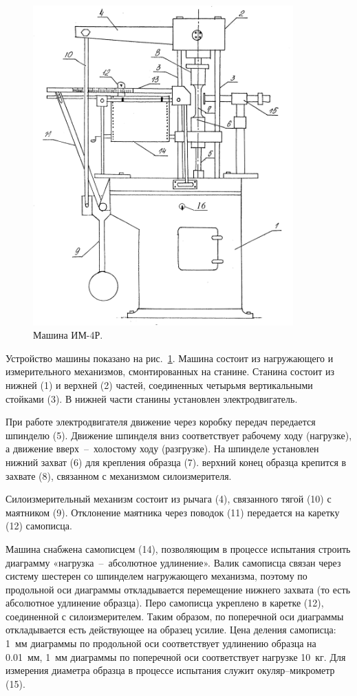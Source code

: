 \documentclass[12pt, a4paper]{article}
\begin{document}
    \begin{figure}[h]
        \centering
        \includegraphics[width = 10cm]{image_1.png}
        \caption{Машина ИМ-4Р.}
        \label{im1}
    \end{figure}
    
    Устройство машины показано на рис.~\ref{im1}. Машина состоит из нагружающего и измерительного механизмов, смонтированных на станине. Станина состоит из нижней (1) и верхней (2) частей, соединенных четырьмя вертикальными стойками (3). В нижней части станины установлен электродвигатель.
    
    При работе электродвигателя движение через коробку передач передается шпинделю (5). Движение шпинделя вниз соответствует рабочему ходу (нагрузке), а движение вверх~--~холостому ходу (разгрузке). На шпинделе установлен нижний захват (6) для крепления образца (7). верхний конец образца крепится в захвате (8), связанном с механизмом силоизмерителя.
    
    Силоизмерительный механизм состоит из рычага (4), связанного тягой (10) с маятником (9). Отклонение маятника через поводок (11) передается на каретку (12) самописца.
    
    Машина снабжена самописцем (14), позволяющим в процессе испытания строить диаграмму «нагрузка~--~абсолютное удлинение». Валик самописца связан через систему шестерен со шпинделем нагружающего механизма, поэтому по продольной оси диаграммы откладывается перемещение нижнего захвата (то есть абсолютное удлинение образца). Перо самописца укреплено в каретке (12), соединенной с силоизмерителем. Таким образом, по поперечной оси диаграммы откладывается есть действующее на образец усилие. Цена деления самописца: 1~мм диаграммы по продольной оси соответствует удлинению образца на 0.01~мм, 1~мм диаграммы по поперечной оси соответствует нагрузке 10~кг. Для измерения диаметра образца в процессе испытания служит окуляр–микрометр (15).
    
\end{document}
